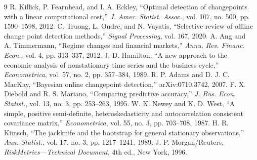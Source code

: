 \documentclass[10pt,twocolumn]{article}
\begin{document}
\begin{thebibliography}{9}\small
{} R. Killick, P. Fearnhead, and I. A. Eckley, ``Optimal detection of changepoints with a linear computational cost,'' \emph{J. Amer. Statist. Assoc.}, vol. 107, no. 500, pp. 1590--1598, 2012.
 C. Truong, L. Oudre, and N. Vayatis, ``Selective review of offline change point detection methods,'' \emph{Signal Processing}, vol. 167, 2020.
 A. Ang and A. Timmermann, ``Regime changes and financial markets,'' \emph{Annu. Rev. Financ. Econ.}, vol. 4, pp. 313--337, 2012.
 J. D. Hamilton, ``A new approach to the economic analysis of nonstationary time series and the business cycle,'' \emph{Econometrica}, vol. 57, no. 2, pp. 357--384, 1989.
 R. P. Adams and D. J. C. MacKay, ``Bayesian online changepoint detection,'' arXiv:0710.3742, 2007.
 F. X. Diebold and R. S. Mariano, ``Comparing predictive accuracy,'' \emph{J. Bus. Econ. Statist.}, vol. 13, no. 3, pp. 253--263, 1995.
 W. K. Newey and K. D. West, ``A simple, positive semi-definite, heteroskedasticity and autocorrelation consistent covariance matrix,'' \emph{Econometrica}, vol. 55, no. 3, pp. 703--708, 1987.
 H. R. K\"unsch, ``The jackknife and the bootstrap for general stationary observations,'' \emph{Ann. Statist.}, vol. 17, no. 3, pp. 1217--1241, 1989.
 J. P. Morgan/Reuters, \emph{RiskMetrics---Technical Document}, 4th ed., New York, 1996.
\end{thebibliography}
\end{document}

